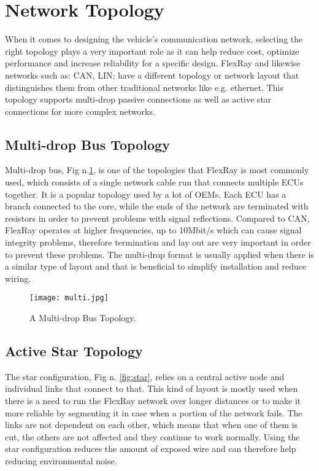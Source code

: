 \documentclass[conference]{IEEEtran}
\begin{document}
\section{Network Topology}
When it comes to designing the vehicle’s communication network, selecting the right topology plays a very important role as it can help reduce cost, optimize performance and increase reliability for a specific design.
FlexRay and likewise networks such as: CAN, LIN; have a different topology or network layout that distinguishes them from other traditional networks like e.g. ethernet. This topology supports multi-drop passive connections as well as active star connections for more complex networks.

\subsection{Multi-drop Bus Topology}
Multi-drop bus, Fig n.\ref{fig:multi}, is one of the topologies that FlexRay is most commonly used, which consists of a single network cable run that connects multiple ECUs together. It is a popular topology used by a lot of OEMs. Each ECU has a branch connected to the core, while the ends of the network are terminated with resistors in order to prevent problems with signal reflections. Compared to CAN, FlexRay operates at higher frequencies, up to 10Mbit/s which can cause signal integrity problems, therefore termination and lay out are very important in order to prevent these problems. The multi-drop format is usually applied when there is a similar type of layout and that is beneficial to simplify installation and reduce wiring.

\begin{figure}[htbp]
 \centerline{ \texttt{[image: multi.jpg]}}
  \caption{A Multi-drop Bus Topology.}
  \label{fig:multi}
\end{figure}

\subsection{Active Star Topology}
The star configuration, Fig n. \ref{fig:star}, relies on a central active node and individual links that connect to that. This kind of layout is mostly used when there is a need to run the FlexRay network over longer distances or to make it more reliable by segmenting it in case when a portion of the network fails. The links are not dependent on each other, which means that when one of them is cut, the others are not affected and they continue to work normally. Using the star configuration reduces the amount of exposed wire and can therefore help reducing environmental noise.
\end{document}
